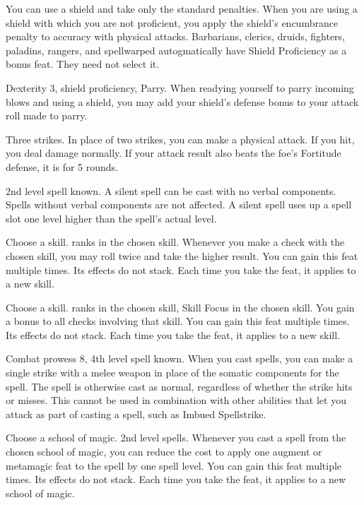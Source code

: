 \featben You can use a shield and take only the standard penalties.
When you are using a shield with which you are not proficient, you apply the shield's encumbrance penalty to accuracy with physical attacks.
Barbarians, clerics, druids, fighters, paladins, rangers, and spellwarped autogmatically have Shield Proficiency as a bonus feat.
They need not select it.

\featpres Dexterity 3, shield proficiency, Parry.
\featben When readying yourself to parry incoming blows and using a shield, you may add your shield's defense bonus to your attack roll made to parry.

\featpre Three strikes.
\featben In place of two strikes, you can make a physical attack.
If you hit, you deal damage normally.
If your attack result also beats the foe's Fortitude defense, it is \staggered for 5 rounds.

\featpre 2nd level spell known.
\featben A silent spell can be cast with no verbal components.
Spells without verbal components are not affected.
A silent spell uses up a spell slot one level higher than the spell's actual level.

Choose a skill.
 ranks in the chosen skill.
\featben Whenever you make a check with the chosen skill, you may roll twice and take the higher result.
You can gain this feat multiple times.
Its effects do not stack.
Each time you take the feat, it applies to a new skill.

Choose a skill.
 ranks in the chosen skill, Skill Focus in the chosen skill.
\featben You gain a  bonus to all checks involving that skill.
You can gain this feat multiple times.
Its effects do not stack.
Each time you take the feat, it applies to a new skill.

\featpres Combat prowess 8, 4th level spell known.
\featben When you cast spells, you can make a single strike with a melee weapon in place of the somatic components for the spell.
The spell is otherwise cast as normal, regardless of whether the strike hits or misses.
This cannot be used in combination with other abilities that let you attack as part of casting a spell, such as Imbued Spellstrike.

Choose a school of magic.
\featpre 2nd level spells.
\featben Whenever you cast a spell from the chosen school of magic, you can reduce the cost to apply one augment or metamagic feat to the spell by one spell level.
You can gain this feat multiple times.
Its effects do not stack.
Each time you take the feat, it applies to a new school of magic.

